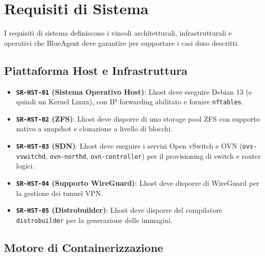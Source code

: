 \section{Requisiti di Sistema}\label{requisiti-di-sistema}

I requisiti di sistema definiscono i vincoli architetturali,
infrastrutturali e operativi che BlueAgent deve garantire per supportare
i casi d\textquotesingle uso descritti.

\subsection{Piattaforma Host e
Infrastruttura}\label{piattaforma-host-e-infrastruttura}

\begin{itemize}
\tightlist
\item
  \textbf{\passthrough{\lstinline!SR-HST-01!} (Sistema Operativo Host)}:
  L\textquotesingle host deve eseguire Debian 13 (e quindi un Kernel
  Linux), con IP forwarding abilitato e fornire
  \passthrough{\lstinline!nftables!}.
\item
  \textbf{\passthrough{\lstinline!SR-HST-02!} (ZFS)}:
  L\textquotesingle host deve disporre di uno storage pool ZFS con
  supporto nativo a snapshot e clonazione a livello di blocchi.
\item
  \textbf{\passthrough{\lstinline!SR-HST-03!} (SDN)}:
  L\textquotesingle host deve eseguire i servizi Open vSwitch e OVN
  (\passthrough{\lstinline!ovs-vswitchd!},
  \passthrough{\lstinline!ovn-northd!},
  \passthrough{\lstinline!ovn-controller!}) per il provisioning di
  switch e router logici.
\item
  \textbf{\passthrough{\lstinline!SR-HST-04!} (Supporto WireGuard)}:
  L\textquotesingle host deve disporre di WireGuard per la gestione dei
  tunnel VPN.
\item
  \textbf{\passthrough{\lstinline!SR-HST-05!} (Distrobuilder)}:
  L\textquotesingle host deve disporre del compilatore
  \passthrough{\lstinline!distrobuilder!} per la generazione delle
  immagini.
\end{itemize}

\subsection{Motore di
Containerizzazione}\label{motore-di-containerizzazione}

